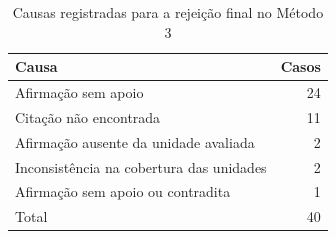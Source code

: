 \begin{table}[htbp]
\centering
\small
\caption{Causas registradas para a rejeição final no Método 3}
\label{tab:causas_bloqueios}
\begin{tabular}{lr}
\hline
Causa & Casos \\
\hline
Afirmação sem apoio & 24 \\
Citação não encontrada & 11 \\
Afirmação ausente da unidade avaliada & 2 \\
Inconsistência na cobertura das unidades & 2 \\
Afirmação sem apoio ou contradita & 1 \\
Total & 40 \\
\hline
\end{tabular}
\end{table}
